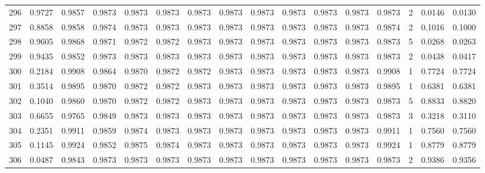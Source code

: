 \begin{tabular}{lrrrrrrrrrrrrrrr}
296 &      0.9727 &  0.9857 &  0.9873 &  0.9873 &  0.9873 &  0.9873 &  0.9873 &  0.9873 &  0.9873 &  0.9873 &   0.9873 &     0.9873 &      2 &                    0.0146 &                     0.0130 \\
297 &      0.8858 &  0.9858 &  0.9874 &  0.9873 &  0.9873 &  0.9873 &  0.9873 &  0.9873 &  0.9873 &  0.9873 &   0.9873 &     0.9874 &      2 &                    0.1016 &                     0.1000 \\
298 &      0.9605 &  0.9868 &  0.9871 &  0.9872 &  0.9872 &  0.9873 &  0.9873 &  0.9873 &  0.9873 &  0.9873 &   0.9873 &     0.9873 &      5 &                    0.0268 &                     0.0263 \\
299 &      0.9435 &  0.9852 &  0.9873 &  0.9873 &  0.9873 &  0.9873 &  0.9873 &  0.9873 &  0.9873 &  0.9873 &   0.9873 &     0.9873 &      2 &                    0.0438 &                     0.0417 \\
300 &      0.2184 &  0.9908 &  0.9864 &  0.9870 &  0.9872 &  0.9872 &  0.9873 &  0.9873 &  0.9873 &  0.9873 &   0.9873 &     0.9908 &      1 &                    0.7724 &                     0.7724 \\
301 &      0.3514 &  0.9895 &  0.9870 &  0.9872 &  0.9872 &  0.9873 &  0.9873 &  0.9873 &  0.9873 &  0.9873 &   0.9873 &     0.9895 &      1 &                    0.6381 &                     0.6381 \\
302 &      0.1040 &  0.9860 &  0.9870 &  0.9872 &  0.9872 &  0.9873 &  0.9873 &  0.9873 &  0.9873 &  0.9873 &   0.9873 &     0.9873 &      5 &                    0.8833 &                     0.8820 \\
303 &      0.6655 &  0.9765 &  0.9849 &  0.9873 &  0.9873 &  0.9873 &  0.9873 &  0.9873 &  0.9873 &  0.9873 &   0.9873 &     0.9873 &      3 &                    0.3218 &                     0.3110 \\
304 &      0.2351 &  0.9911 &  0.9859 &  0.9874 &  0.9873 &  0.9873 &  0.9873 &  0.9873 &  0.9873 &  0.9873 &   0.9873 &     0.9911 &      1 &                    0.7560 &                     0.7560 \\
305 &      0.1145 &  0.9924 &  0.9852 &  0.9875 &  0.9874 &  0.9873 &  0.9873 &  0.9873 &  0.9873 &  0.9873 &   0.9873 &     0.9924 &      1 &                    0.8779 &                     0.8779 \\
306 &      0.0487 &  0.9843 &  0.9873 &  0.9873 &  0.9873 &  0.9873 &  0.9873 &  0.9873 &  0.9873 &  0.9873 &   0.9873 &     0.9873 &      2 &                    0.9386 &                     0.9356 \\

\end{tabular}
